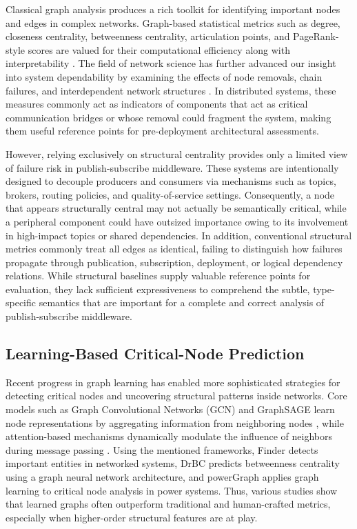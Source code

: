 \documentclass[sigconf,9pt,anonymous]{acmart}
\begin{document}
Classical graph analysis produces a rich toolkit for identifying important nodes and edges in complex networks. Graph-based statistical metrics such as degree, closeness centrality, betweenness centrality, articulation points, and PageRank-style scores are valued for their computational efficiency along with interpretability \cite{freeman1977centrality, brandes2001faster, brin1998anatomy}. The field of network science has further advanced our insight into system dependability by examining the effects of node removals, chain failures, and interdependent network structures \cite{albert2000error, buldyrev2010catastrophic}. In distributed systems, these measures commonly act as indicators of components that act as critical communication bridges or whose removal could fragment the system, making them useful reference points for pre-deployment architectural assessments.

However, relying exclusively on structural centrality provides only a limited view of failure risk in publish-subscribe middleware. These systems are intentionally designed to decouple producers and consumers via mechanisms such as topics, brokers, routing policies, and quality-of-service settings. Consequently, a node that appears structurally central may not actually be semantically critical, while a peripheral component could have outsized importance owing to its involvement in high-impact topics or shared dependencies. In addition, conventional structural metrics commonly treat all edges as identical, failing to distinguish how failures propagate through publication, subscription, deployment, or logical dependency relations. While structural baselines supply valuable reference points for evaluation, they lack sufficient expressiveness to comprehend the subtle, type-specific semantics that are important for a complete and correct analysis of publish-subscribe middleware.

\subsection{Learning-Based Critical-Node Prediction}

Recent progress in graph learning has enabled more sophisticated strategies for detecting critical nodes and uncovering structural patterns inside networks. Core models such as Graph Convolutional Networks (GCN) and GraphSAGE learn node representations by aggregating information from neighboring nodes \cite{kipf2017gcn, hamilton2017inductive}, while attention-based mechanisms dynamically modulate the influence of neighbors during message passing \cite{velickovic2018gat}. Using the mentioned frameworks, Finder \cite{fan2020finder} detects important entities in networked systems, DrBC \cite{munikoti2022drbc} predicts betweenness centrality using a graph neural network architecture, and powerGraph \cite{munikoti2024powergraph} applies graph learning to critical node analysis in power systems. Thus, various studies show that learned graphs often outperform traditional and human-crafted metrics, especially when higher-order structural features are at play.
\end{document}
